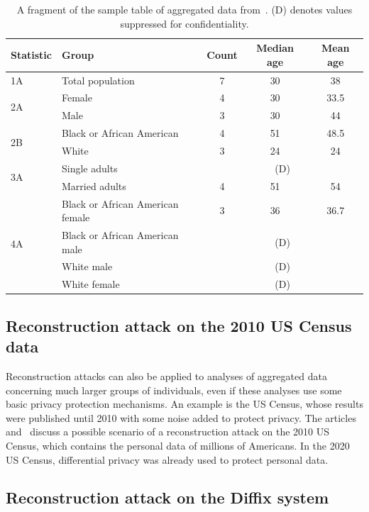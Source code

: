 \begin{table}[htbp]
\centering
\small
\caption{A fragment of the sample table of aggregated data from~\cite{publicDataAttack}. (D) denotes values suppressed for confidentiality.}
\label{tab:summary_stats}
\begin{tabular}{@{}llccc@{}}
\toprule
\textbf{Statistic} & \textbf{Group} & \textbf{Count} & \textbf{Median age} & \textbf{Mean age} \\
\midrule
1A & Total population & 7 & 30 & 38 \\
\midrule
\multirow{2}{*}{2A} & Female & 4 & 30 & 33.5 \\
   & Male & 3 & 30 & 44 \\
\midrule
\multirow{2}{*}{2B} & Black or African American & 4 & 51 & 48.5 \\
   & White & 3 & 24 & 24 \\
\midrule
\multirow{2}{*}{3A} & Single adults & \multicolumn{3}{c}{(D)} \\
   & Married adults & 4 & 51 & 54 \\
\midrule
\multirow{4}{*}{4A} & Black or African American female & 3 & 36 & 36.7 \\
   & Black or African American male & \multicolumn{3}{c}{(D)} \\
   & White male & \multicolumn{3}{c}{(D)} \\
   & White female & \multicolumn{3}{c}{(D)} \\
\bottomrule
\end{tabular}
\end{table}

\subsection{Reconstruction attack on the 2010 US Census data}

Reconstruction attacks can also be applied to analyses of aggregated data concerning much larger groups of individuals, even if these analyses use some basic privacy protection mechanisms. An example is the US Census, whose results were published until 2010 with some noise added to protect privacy. The articles~\cite{Census_Bureau_Reconstruction_2010} and~\cite{Census_Bureau_Reconstruction_2010_2} discuss a possible scenario of a reconstruction attack on the 2010 US Census, which contains the personal data of millions of Americans. In the 2020 US Census, differential privacy was already used to protect personal data.

\subsection{Reconstruction attack on the Diffix system}

